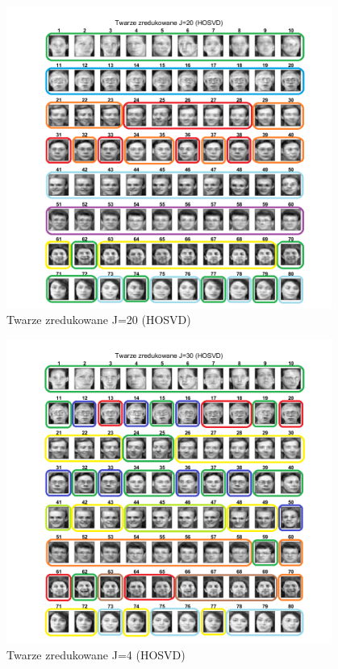 \documentclass[11pt, a4paper]{article}
\begin{document}
\begin{figure}[H]
	\centering
	\includegraphics[width=0.95\textwidth]{./assets/rezultat_HOSVD_j20.png}
	\caption{Twarze zredukowane J=20 (HOSVD)}
	\label{fig:rezultat_HOSVD_j20}
\end{figure}

\begin{figure}[H]
	\centering
	\includegraphics[width=0.95\textwidth]{./assets/rezultat_HOSVD_j30.png}
	\caption{Twarze zredukowane J=4 (HOSVD)}
	\label{fig:rezultat_HOSVD_j30}
\end{figure}
\end{document}
